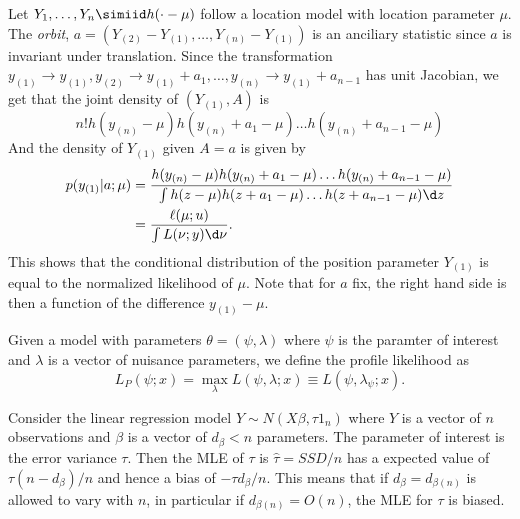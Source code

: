 \begin{example} \label{ex-loc-model}
    Let $Y_1, \ldots, Y_n \simiid h(\cdot - \mu)$ follow a location model with location parameter $\mu$. The \textit{orbit}, $a = (Y_{(2)} - Y_{(1)}, \ldots, Y_{(n)} - Y_{(1)})$ is an anciliary statistic since $a$ is invariant under translation. Since the transformation $y_{(1)} \rightarrow y_{(1)}, y_{(2)} \rightarrow y_{(1)} + a_1, \ldots, y_{(n)} \rightarrow y_{(1)} + a_{n-1}$ has unit Jacobian, we get that the joint density of $(Y_{(1)}, A)$ is
    \begin{equation*}
        n!h(y_{(n)} - \mu)h(y_{(n)} + a_1 - \mu)\ldots h(y_{(n)} + a_{n-1} - \mu)
    \end{equation*}
    And the density of $Y_{(1)}$ given $A = a$ is given by
    \begin{align*}
        p(y_{(1)} | a; \mu) &= \frac{h(y_{(n)} - \mu)h(y_{(n)} + a_1 - \mu)\ldots h(y_{(n)} + a_{n-1} - \mu)}{\int{h(z - \mu)h(z + a_1 - \mu)\ldots h(z + a_{n-1} - \mu)}\d z}\\
        &= \frac{\ell(\mu; u)}{\int{L(\nu; y) \d \nu}}.
    \end{align*}
    This shows that the conditional distribution of the position parameter $Y_{(1)}$ is equal to the normalized likelihood of $\mu$. Note that for $a$ fix, the right hand side is then a function of the difference $y_{(1)} - \mu$.
\end{example}

\begin{definition}
    Given a model with parameters $\theta = (\psi, \lambda)$ where $\psi$ is the paramter of interest and $\lambda$ is a vector of nuisance parameters, we define the profile likelihood as
    \begin{equation*}
        L_P(\psi; x) = \max_{\lambda} L(\psi, \lambda; x) \equiv L(\psi, \lambda_\psi; x).
    \end{equation*}
\end{definition}
\begin{example}
    Consider the linear regression model $Y \sim N(X\beta, \tau 1_n)$ where $Y$ is a vector of $n$ observations and $\beta$ is a vector of $d_\beta < n$ parameters. The parameter of interest is the error variance $\tau$. Then the MLE of $\tau$ is $\hat\tau = SSD / n$ has a expected value of $\tau (n - d_\beta)/n$ and hence a bias of $-\tau d_\beta/n$. This means that if $d_\beta = d_{\beta(n)}$ is allowed to vary with $n$, in particular if $d_{\beta(n)} = O(n)$, the MLE for $\tau$ is biased.
\end{example}

